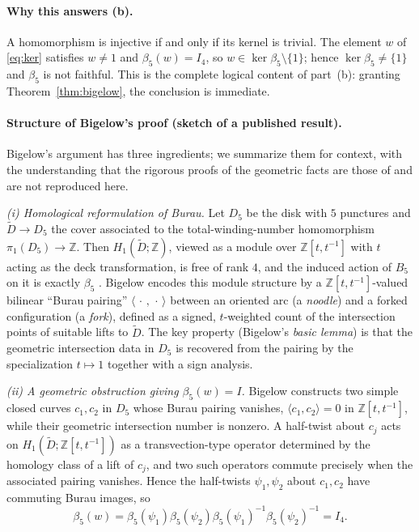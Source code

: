 \documentclass{amsart}
\theoremstyle{remark}
\begin{document}
\paragraph{Why this answers (b).}
A homomorphism is injective if and only if its kernel is trivial. The element
$w$ of \eqref{eq:ker} satisfies $w\ne1$ and $\beta_5(w)=I_4$, so
$w\in\ker\beta_5\setminus\{1\}$; hence $\ker\beta_5\ne\{1\}$ and $\beta_5$ is
not faithful. This is the complete logical content of part~(b): granting
Theorem~\ref{thm:bigelow}, the conclusion is immediate.

\paragraph{Structure of Bigelow's proof (sketch of a published result).}
Bigelow's argument \cite{Bigelow1999} has three ingredients; we summarize them
for context, with the understanding that the rigorous proofs of the geometric
facts are those of \cite{Bigelow1999} and are not reproduced here.

\emph{(i) Homological reformulation of Burau.}
Let $D_5$ be the disk with $5$ punctures and $\widetilde D\to D_5$ the cover
associated to the total-winding-number homomorphism
$\pi_1(D_5)\to\mathbb Z$. Then $H_1(\widetilde D;\mathbb Z)$, viewed as a module
over $\mathbb Z[t,t^{-1}]$ with $t$ acting as the deck transformation, is free of
rank $4$, and the induced action of $B_5$ on it is exactly $\beta_5$
\cite[\S3.3]{KasselTuraev}. Bigelow encodes this module structure by a
$\mathbb Z[t,t^{-1}]$-valued bilinear ``Burau pairing''
$\langle\,\cdot\,,\,\cdot\,\rangle$ between an oriented arc (a \emph{noodle})
and a forked configuration (a \emph{fork}), defined as a signed, $t$-weighted
count of the intersection points of suitable lifts to $\widetilde D$. The key
property (Bigelow's \emph{basic lemma}) is that the geometric intersection data
in $D_5$ is recovered from the pairing by the specialization $t\mapsto 1$
together with a sign analysis.

\emph{(ii) A geometric obstruction giving $\beta_5(w)=I$.}
Bigelow constructs two simple closed curves $c_1,c_2$ in $D_5$ whose Burau
pairing vanishes, $\langle c_1,c_2\rangle=0$ in $\mathbb Z[t,t^{-1}]$, while
their geometric intersection number is nonzero. A half-twist about $c_j$ acts on
$H_1(\widetilde D;\mathbb Z[t,t^{-1}])$ as a transvection-type operator
determined by the homology class of a lift of $c_j$, and two such operators
commute precisely when the associated pairing vanishes. Hence the half-twists
$\psi_1,\psi_2$ about $c_1,c_2$ have commuting Burau images, so
\[
\beta_5(w)=\beta_5(\psi_1)\beta_5(\psi_2)\beta_5(\psi_1)^{-1}
\beta_5(\psi_2)^{-1}=I_4 .
\]
\end{document}
